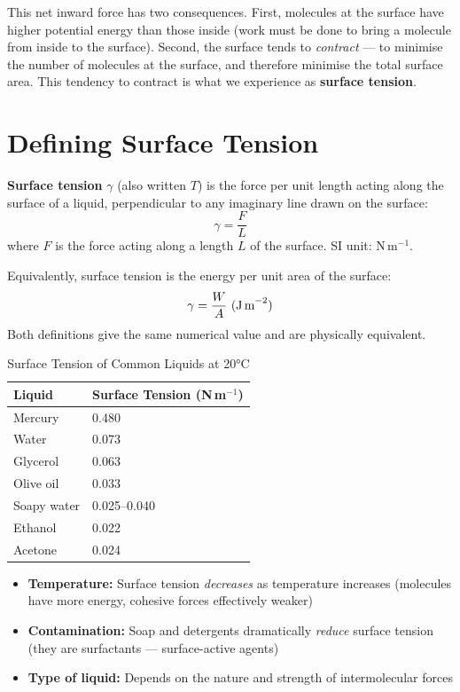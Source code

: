 This net inward force has two consequences. First,
molecules at the surface have higher potential energy
than those inside (work must be done to bring a
molecule from inside to the surface). Second, the
surface tends to \textit{contract} --- to minimise
the number of molecules at the surface, and therefore
minimise the total surface area. This tendency to
contract is what we experience as \textbf{surface
tension}.

\section{Defining Surface Tension}

\begin{definitionbox}
\textbf{Surface tension} $\gamma$ (also written $T$)
is the force per unit length acting along the surface
of a liquid, perpendicular to any imaginary line
drawn on the surface:
\[
  \gamma = \frac{F}{L}
\]
where $F$ is the force acting along a length $L$ of
the surface. SI unit: N\,m$^{-1}$.

Equivalently, surface tension is the energy per unit
area of the surface:
\[
  \gamma = \frac{W}{A}\ \text{(J\,m}^{-2}\text{)}
\]
Both definitions give the same numerical value and
are physically equivalent.
\end{definitionbox}

\begin{table}[H]
\centering
\caption{Surface Tension of Common Liquids at 20°C}
\label{tab:surface_tension}
\begin{tabular}{ll}
\toprule
\textbf{Liquid} & \textbf{Surface Tension (N\,m$^{-1}$)}\\
\midrule
Mercury & 0.480\\
Water & 0.073\\
Glycerol & 0.063\\
Olive oil & 0.033\\
Soapy water & 0.025--0.040\\
Ethanol & 0.022\\
Acetone & 0.024\\
\bottomrule
\end{tabular}
\end{table}

\begin{keybox}
\begin{itemize}[noitemsep]
  \item \textbf{Temperature:} Surface tension
  \textit{decreases} as temperature increases
  (molecules have more energy, cohesive forces
  effectively weaker)
  \item \textbf{Contamination:} Soap and detergents
  dramatically \textit{reduce} surface tension (they
  are surfactants --- surface-active agents)
  \item \textbf{Type of liquid:} Depends on the
  nature and strength of intermolecular forces
\end{itemize}
\end{keybox}

